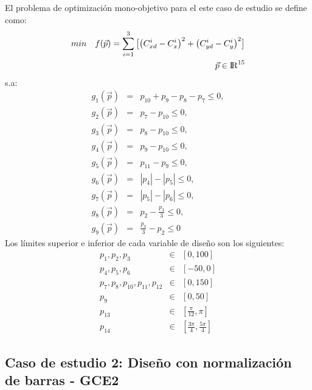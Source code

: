El problema de optimización mono-objetivo para el este caso de estudio se define como:
 \begin{equation}\label{eq:gripper_FO1}
 \begin{aligned}
min\quad  f(\vec{p})=
\sum_{i=1}^{3}\big[\big(C^{i}_{xd}-C^{i}_{x} \big)^2 +\big(C^{i}_{yd}-C^{i}_{y} \big)^2\big]
\\
\vec{p} \in  {\rm I\!R}^{15}
\\
\end{aligned}
\end{equation}
s.a:
\begin{eqnarray}\label{eq:Restricciones gripper1}
g_{1}(\vec{p})&=&p_{10}+ p_{9}-p_{8}-p_{7} \leq 0,\\
g_{2}(\vec{p})&=&p_{7}-p_{10} \leq 0,\\
g_{3}(\vec{p})&=&p_{8}-p_{10} \leq 0,\\
g_{4}(\vec{p})&=&p_{9}-p_{10} \leq 0,\\
g_{5}(\vec{p})&=&p_{11}-p_{9} \leq 0,\\
g_{6}(\vec{p})&=&|p_{4}|-|p_{5}| \leq 0,\\
g_{7}(\vec{p})&=&|p_{5}|-|p_{6}| \leq 0,\\
g_{8}(\vec{p})&=&p_{2}-\frac{p_3}{3} \leq 0,\\
g_{9}(\vec{p})&=&\frac{p_3}{3}-p_{2} \leq 0
\end{eqnarray}
Los límites superior e inferior de cada variable de diseño son los siguientes:
\begin{eqnarray}\label{eq:limites variables griper1}
p_1,p_2,p_3 & \in & \left[ 0,100\right] \\
p_4,p_5,p_6 & \in & \left[ -50,0\right] \\
p_7,p_8,p_{10},p_{11},p_{12} & \in & \left[ 0,150 \right] \\
p_9 & \in & \left[ 0,50\right] \\
p_{13} & \in & \left[ \frac{\pi}{12},\pi \right] \\
p_{14} & \in & \left[ \frac{3\pi}{4},\frac{5\pi}{4} \right]
\end{eqnarray}
\subsection{Caso de estudio 2: Diseño con normalización de barras - GCE2}

